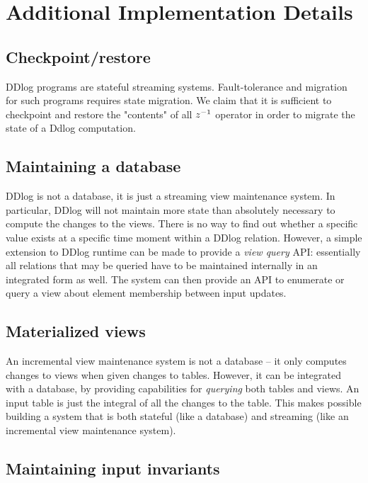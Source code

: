 \section{Additional Implementation Details}\label{sec:implementation}

\subsection{Checkpoint/restore}

DDlog programs are stateful streaming systems.  Fault-tolerance and 
migration for such programs requires state migration.  We claim that it is 
sufficient to checkpoint and restore the "contents" of all $z^{-1}$ operator
in order to migrate the state of a Ddlog computation.

\subsection{Maintaining a database}

DDlog is not a database, it is just a streaming view maintenance system.
In particular, DDlog will not maintain more state than absolutely necessary
to compute the changes to the views.  There is no way to find out whether 
a specific value exists at a specific time moment within a DDlog relation.
However, a simple extension to DDlog runtime can be made to provide a \emph{view query}
API: essentially all relations that may be queried have to be maintained 
internally in an integrated form as well.  The system can then provide
an API to enumerate or query a view about element membership between 
input updates.

\subsection{Materialized views}

An incremental view maintenance system is not a database -- it only computes changes
to views when given changes to tables.  However, it can be integrated with a 
database, by providing capabilities for \emph{querying} both tables and views.
An input table is just the integral of all the changes to the table.  This makes
possible building a system that is both stateful (like a database) and streaming
(like an incremental view maintenance system).

\subsection{Maintaining input invariants}

